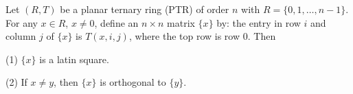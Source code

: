 Let $(R, T)$ be a planar ternary ring (PTR) of order $n$ with $R = \{0, 1, \dots, n-1\}$. For any $x \in R$, $x \neq 0$, define an $n \times n$ matrix $\{x\}$ by: the entry in row $i$ and column $j$ of $\{x\}$ is $T(x, i, j)$, where the top row is row $0$. Then

(1) $\{x\}$ is a latin square.

(2) If $x \neq y$, then $\{x\}$ is orthogonal to $\{y\}$.
